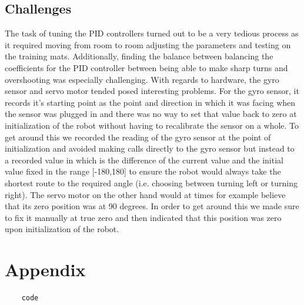 \documentclass[12pt]{article}
\begin{document}
\subsection{Challenges}
The task of tuning the PID controllers turned out to be a very tedious process as it required moving from room to room adjusting the parameters and testing on the training mats. Additionally, finding the balance between balancing the coefficients for the PID controller between being able to make sharp turns and overshooting was especially challenging. With regards to hardware, the gyro sensor and servo motor tended posed interesting problems. For the gyro sensor, it records it's starting point as the point and direction in which it was facing when the sensor was plugged in and there was no way to set that value back to zero at initialization of the robot without having to recalibrate the sensor on a whole. To get around this we recorded the reading of the gyro sensor at the point of initialization and avoided making calls directly to the gyro sensor but instead to a recorded value in which is the difference of the current value and the initial value fixed in the range [-180,180] to ensure the robot would always take the shortest route to the required angle (i.e. choosing between turning left or turning right). The servo motor on the other hand would at times for example believe that its zero position was at 90 degrees. In order to get around this we made sure to fix it manually at true zero and then indicated that this position was zero upon initialization of the robot. 

\section*{Appendix}

\begin{verbatim}
	code
\end{verbatim}
\end{document}
